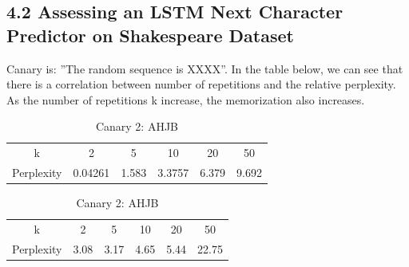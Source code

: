 \subsection*{4.2 Assessing an LSTM Next Character Predictor on Shakespeare Dataset}

Canary is: ”The random sequence is XXXX”. In the table below, we can see that there
is a correlation between number of repetitions and the relative perplexity. As the number
of repetitions k increase, the memorization also increases.

\begin{table}[h]
    \centering
    \begin{tabular}{cccccc}
        k & 2 & 5 & 10 & 20 & 50 \\
        Perplexity & 0.04261 & 1.583 &  3.3757 &  6.379 &  9.692 \\
    \end{tabular}
    \caption{Canary 1: ABCD}

    \vspace{0.5cm}

    \begin{tabular}{cccccc}
        k & 2 & 5 & 10 & 20 & 50 \\
        Perplexity & 3.08 &  3.17 & 4.65 & 5.44 & 22.75 \\
    \end{tabular}
    \caption{Canary 2: AHJB}
\end{table}



